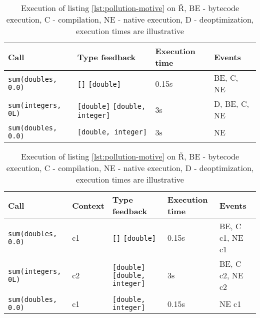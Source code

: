 \begin{table}
	\begin{subtable}{\linewidth}
		\begin{adjustwidth}{-2cm}{-2cm}
			\small
			\centering
			\begin{tabular}{l l l l}
				\hline
				\textbf{Call}              & \textbf{Type feedback}                                   & \textbf{Execution time} & \textbf{Events} \\
				\hline
				\texttt{sum(doubles, 0.0)} & \texttt{[]} \rightarrow \texttt{[double]}                & 0.15s                   & BE, C, NE       \\
				\texttt{sum(integers, 0L)} & \texttt{[double]} \rightarrow \texttt{[double, integer]} & 3s                      & D, BE, C, NE    \\
				\texttt{sum(doubles, 0.0)} & \texttt{[double, integer]}                               & 3s                      & NE              \\
				\hline
			\end{tabular}
		\end{adjustwidth}

		\label{tbl:pollution-motive-baseline}
	\end{subtable}

	\vspace{1em}

	\begin{subtable}{\linewidth}
		\begin{adjustwidth}{-2cm}{-2cm}
			\small
			\centering
			\begin{tabular}{l l l l l}
				\hline
				\textbf{Call}              & \textbf{Context} & \textbf{Type feedback}                                   & \textbf{Execution time} & \textbf{Events} \\
				\hline
				\texttt{sum(doubles, 0.0)} & c1               & \texttt{[]} \rightarrow \texttt{[double]}                & 0.15s                   & BE, C c1, NE c1 \\
				\texttt{sum(integers, 0L)} & c2               & \texttt{[double]} \rightarrow \texttt{[double, integer]} & 3s                      & BE, C c2, NE c2 \\
				\texttt{sum(doubles, 0.0)} & c1               & \texttt{[double, integer]}                               & 0.15s                   & NE c1           \\
				\hline
			\end{tabular}
		\end{adjustwidth}

		\label{tbl:pollution-motive-context}
	\end{subtable}

	\caption{Execution of listing \ref{lst:pollution-motive} on Ř, BE - bytecode execution, C - compilation, NE - native execution, D - deoptimization, execution times are illustrative}
\end{table}

